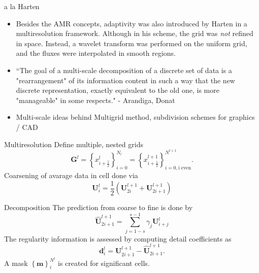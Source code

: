 \documentclass{beamer}
\begin{document}
\begin{frame}{a la Harten}
    \begin{itemize}
        \item<1-> Besides the AMR concepts, adaptivity was also introduced by
            Harten in a multiresolution framework. Although in his scheme, the
            grid was \textit{not} refined in space. Instead, a wavelet
            transform was performed on the uniform grid, and the fluxes were
            interpolated in smooth regions. \\
        \item<2->``The goal of a multi-scale decomposition of a discrete set of
            data is a "rearrangement" of its information content in such a way
            that the new discrete representation, exactly equivalent to the old
            one, is more "manageable" in some respects." - Arandiga, Donat
        \item<3-> Multi-scale ideas behind Multigrid method, subdivision
            schemes for graphics / CAD
    \end{itemize}
\end{frame}

\begin{frame}{Multiresolution}
    Define multiple, nested grids
    \begin{equation*}
        \mathbf{G}^{l} = \left\{ x^{l}_{i+\frac{1}{2}} \right\}_{i=0}^{N_{l}} =
            \left\{ x^{l+1}_{i+\frac{1}{2}} \right\}_{i=0,\text{i even}}^{N^{l+1}}.
    \end{equation*}
    Coarsening of avarage data in cell done via
    \begin{equation*}
        \mathbf{U}^{l}_{i} = \frac{1}{2} \left( \mathbf{U}^{l+1}_{2i} + \mathbf{U}^{l+1}_{2i+1} \right)
    \end{equation*}
\end{frame}

\begin{frame}{Decomposition}
    The prediction from coarse to fine is done by
    \begin{equation*}
        \mathbf{\hat{U}}^{l+1}_{2i+1} = \sum_{j=1-s}^{s-1} \gamma_{j} \mathbf{U}^{l}_{i+j}
    \end{equation*}
    The regularity information is assessed by computing detail coefficients as
    \begin{equation*}
        \mathbf{d}^{l}_{i} = \mathbf{U}^{l+1}_{2i+1} - \mathbf{\hat{U}}^{l+1}_{2i+1}.
    \end{equation*}
    A mask $\left\{ \mathbf{m} \right\}_{i}^{N^{l}}$ is created for significant cells.
\end{frame}
\end{document}
